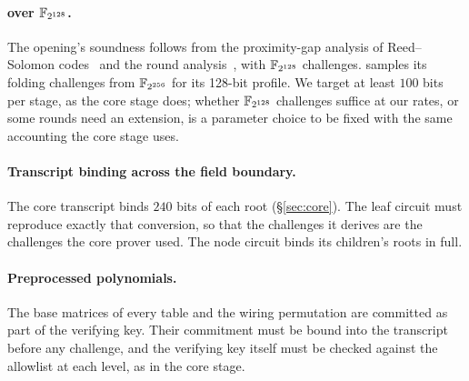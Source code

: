 \paragraph{\WHIR{} over $\mathbb{F}_{2^{128}}$.} The opening's soundness follows from the proximity-gap analysis of Reed--Solomon codes~\citep{proximity-gaps,proximity-gaps-2025} and the \WHIR{} round analysis~\citep{whir}, with $\mathbb{F}_{2^{128}}$ challenges. \Flock{} samples its folding challenges from $\mathbb{F}_{2^{256}}$ for its 128-bit profile. We target at least $100$ bits per stage, as the core stage does; whether $\mathbb{F}_{2^{128}}$ challenges suffice at our rates, or some rounds need an extension, is a parameter choice to be fixed with the same accounting the core stage uses.

\paragraph{Transcript binding across the field boundary.} The core transcript binds $240$ bits of each \Blake{} root (\S\ref{sec:core}). The leaf circuit must reproduce exactly that conversion, so that the challenges it derives are the challenges the core prover used. The node circuit binds its children's roots in full.

\paragraph{Preprocessed polynomials.} The base matrices of every table and the wiring permutation are committed as part of the verifying key. Their commitment must be bound into the transcript before any challenge, and the verifying key itself must be checked against the allowlist at each level, as in the core stage.
